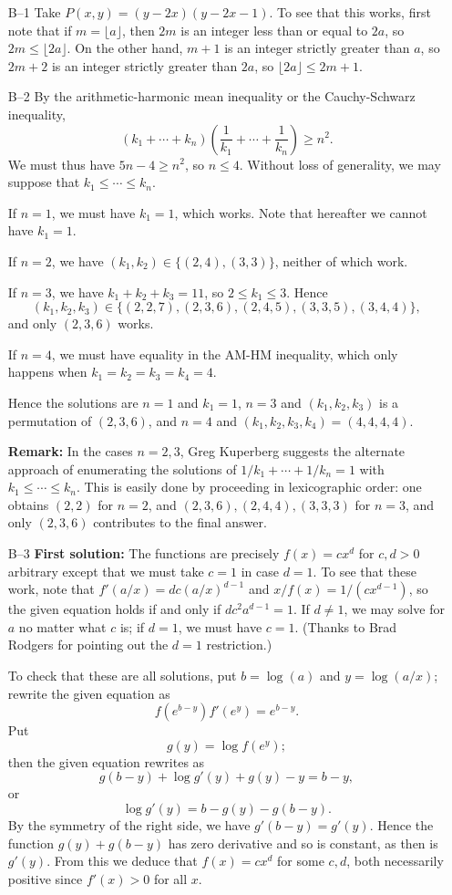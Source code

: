 \documentclass[amssymb,twocolumn,pra,10pt,aps]{revtex4-1}
\begin{document}
\begin{itemize}
\item[B--1]
Take $P(x,y) = (y-2x)(y-2x-1)$.
To see that this works, first note that if $m = \lfloor a \rfloor$,
then $2m$ is an integer less than or equal to $2a$, so
$2m \leq \lfloor 2a \rfloor$. On the other hand, $m+1$
is an integer strictly greater than $a$, so $2m+2$ is an integer
strictly greater than $2a$, so $\lfloor 2a \rfloor \leq 2m+1$.

\item[B--2]
By the arithmetic-harmonic mean inequality or the Cauchy-Schwarz inequality,
\[
(k_1 + \cdots + k_n)\left(\frac{1}{k_1} + \cdots + \frac{1}{k_n} \right)
\geq n^2.
\]
We must thus have $5n-4 \geq n^2$, so $n \leq 4$. Without loss of generality,
we may suppose that $k_1 \leq \cdots \leq k_n$.

If $n=1$, we must have $k_1 = 1$, which works. Note that hereafter we cannot
have $k_1 =1$.

If $n = 2$, we have $(k_1,k_2) \in \{(2,4), (3,3)\}$, neither of which work.

If $n=3$, we have $k_1 +k_2 +k_3 =11$, so $2 \leq k_1 \leq 3$.
Hence
\[
(k_1,k_2,k_3) \in \{(2,2,7),(2,3,6),(2,4,5),(3,3,5),(3,4,4)\},
\]
and only $(2,3,6)$ works.

If $n = 4$, we must have equality in the AM-HM inequality, which only
happens when $k_1 = k_2 = k_3 = k_4 = 4$.

Hence the solutions are $n = 1$ and $k_1 = 1$,
$n=3$ and $(k_1,k_2,k_3)$ is a permutation of $(2,3,6)$,
and $n=4$ and $(k_1,k_2,k_3,k_4) = (4,4,4,4)$.

\textbf{Remark:}
In the cases $n=2,3$, Greg Kuperberg suggests the alternate
approach of
enumerating the
solutions of $1/k_1 + \cdots + 1/k_n = 1$ with $k_1 \leq \cdots \leq k_n$.
This is easily done by
proceeding in lexicographic order: one obtains $(2,2)$ for $n=2$, and
$(2,3,6), (2,4,4), (3,3,3)$ for $n=3$, and only $(2,3,6)$ contributes
to the final answer.

\item[B--3]
\textbf{First solution:}
The functions are precisely $f(x) = cx^d$ for $c,d > 0$ arbitrary
except that we must take $c=1$ in case $d=1$. To see that these work,
note that $f'(a/x) = d c (a/x)^{d-1}$ and $x/f(x) = 1/(c x^{d-1})$,
so the given equation holds if and only if $d c^2 a^{d-1} = 1$. If
$d \neq 1$, we may solve for $a$ no matter what $c$ is; if
$d=1$, we must have $c=1$. (Thanks to Brad Rodgers for pointing out
the $d=1$ restriction.)

To check that these are all solutions,
put $b = \log(a)$ and $y = \log(a/x)$; rewrite the given equation as
\[
f(e^{b-y}) f'(e^y) = e^{b-y}.
\]
Put
\[
g(y) = \log f(e^y);
\]
then the given equation rewrites as
\[
g(b-y) + \log g'(y) + g(y) - y = b-y,
\]
or
\[
\log g'(y) = b -g(y) - g(b-y).
\]
By the symmetry of the right side,
we have $g'(b-y) = g'(y)$. Hence the function
$g(y) + g(b-y)$ has zero derivative and so is constant,
as then is $g'(y)$.
From this we deduce that $f(x) = cx^d$ for some $c,d$, both
necessarily positive since $f'(x) > 0$ for all $x$.


\end{itemize}
\end{document}
